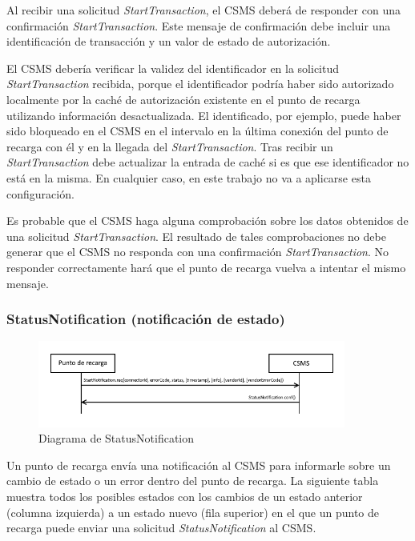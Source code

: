 \documentclass[12pt,a4paper,onecolumn,oneside]{report}
\begin{document}
Al recibir una solicitud \textit{StartTransaction}, el CSMS deberá de responder con una confirmación \textit{StartTransaction}. Este mensaje de confirmación debe incluir una identificación de transacción y un valor de estado de autorización.

El CSMS debería verificar la validez del identificador en la solicitud \textit{StartTransaction} recibida, porque el identificador podría haber sido autorizado localmente por la caché de autorización existente en el punto de recarga utilizando información desactualizada. El identificado, por ejemplo, puede haber sido bloqueado en el CSMS en el intervalo en la última conexión del punto de recarga con él y en la llegada del \textit{StartTransaction}. Tras recibir un \textit{StartTransaction} debe actualizar la entrada de caché si es que ese identificador no está en la misma. En cualquier caso, en este trabajo no va a aplicarse esta configuración.

Es probable que el CSMS haga alguna comprobación sobre los datos obtenidos de una solicitud \textit{StartTransaction}. El resultado de tales comprobaciones no debe generar que el CSMS no responda con una confirmación \textit{StartTransaction}. No responder correctamente hará que el punto de recarga vuelva a intentar el mismo mensaje.


\subsubsection{StatusNotification (notificación de estado)}
\label{StatusNotification (notificación de estado)}


\begin{figure}[H] 
\centering
  \includegraphics[width=0.9\textwidth]{figuras/diagramastatusnotification.png}
  \caption[Diagrama de \textit{StatusNotification}]{Diagrama de StatusNotification\\
  }
  \label{fig:diagramastatusnotification}
\end{figure}



Un punto de recarga envía una notificación al CSMS para informarle sobre un cambio de estado o un error dentro del punto de recarga. La siguiente tabla muestra todos los posibles estados con los cambios de un estado anterior (columna izquierda) a un estado nuevo (fila superior) en el que un punto de recarga puede enviar una solicitud \textit{StatusNotification} al CSMS.
\end{document}
